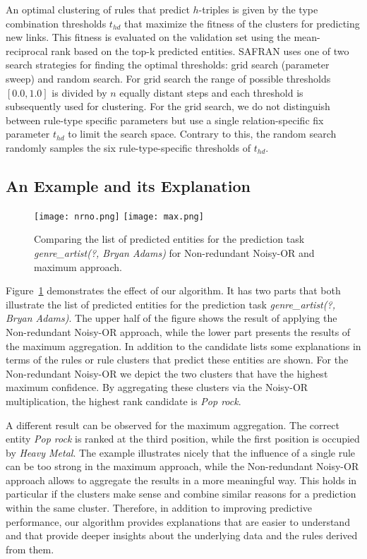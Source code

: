 \documentclass[akbc,twoside,11pt,lettersize]{article}
\begin{document}
An optimal clustering of rules that predict $h$-triples is given by the type combination thresholds $t_{hd}$ that maximize the fitness of the clusters for predicting new links. This fitness is evaluated on the validation set using the mean-reciprocal rank based on the top-k predicted entities. 
SAFRAN uses one of two search strategies for finding the optimal thresholds: grid search (parameter sweep) and random search. For grid search the range of possible thresholds $[0.0, 1.0]$ is divided by $n$ equally distant steps and each threshold is subsequently used for clustering. For the grid search, we do not distinguish between rule-type specific parameters but use a single relation-specific fix parameter $t_{hd}$ to limit the search space. Contrary to this, the random search randomly samples the six rule-type-specific thresholds of $t_{hd}$. 


\subsection{An Example and its Explanation}







\begin{figure}[htb]
\centering
\texttt{[image: nrno.png]}
\texttt{[image: max.png]}
\caption{Comparing the list of predicted entities for the prediction task \textit{genre\_artist(?, Bryan Adams)} for  Non-redundant Noisy-OR and maximum approach.}
\label{nrnomaxex}
\end{figure}

Figure~\ref{nrnomaxex} demonstrates the effect of our algorithm. It has two parts that both illustrate the list of predicted entities for the prediction task \textit{genre\_artist(?, Bryan Adams)}. The upper half of the figure shows the result of applying the Non-redundant Noisy-OR approach, while the lower part presents the results of the maximum aggregation. In addition to the candidate lists some explanations in terms of the rules or rule clusters that predict these entities are shown. For the Non-redundant Noisy-OR we depict the two clusters that have the highest maximum confidence. By aggregating these clusters via the Noisy-OR multiplication, the highest rank candidate is \textit{Pop rock}. 

A different result can be observed for the maximum aggregation. The correct entity \textit{Pop rock} is ranked at the third position, while the first position is occupied by \textit{Heavy Metal}. The example illustrates nicely that the influence of a single rule can be too strong in the maximum approach, while the Non-redundant Noisy-OR approach allows to aggregate the results in a more meaningful way. This holds in particular if the clusters make sense and combine similar reasons for a prediction within the same cluster. Therefore, in addition to improving predictive performance, our algorithm provides explanations that are easier to understand and that provide deeper insights about the underlying data and the rules derived from them.
\end{document}
